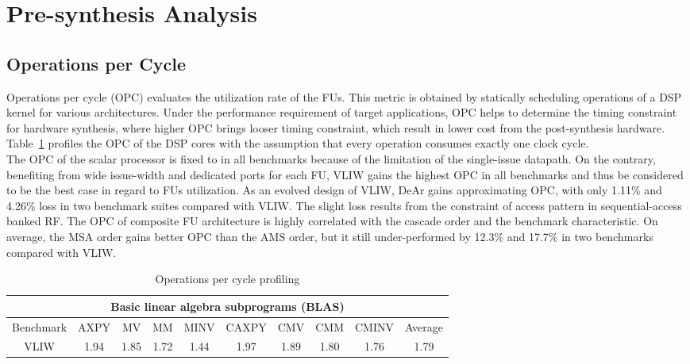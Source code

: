 \section{Pre-synthesis Analysis}
{
    \subsection{Operations per Cycle}
    Operations per cycle (OPC) evaluates the utilization rate of the FUs.
    This metric is obtained by statically scheduling operations of a DSP kernel for various architectures.
    Under the performance requirement of target applications, OPC helps to determine the timing constraint for hardware synthesis, 
    where higher OPC brings looser timing constraint, which result in lower cost from the post-synthesis hardware.
    Table~\ref{tab:opc} profiles the OPC of the DSP cores with the assumption that every operation consumes exactly one clock cycle.
    \\\indent The OPC of the scalar processor is fixed to in all benchmarks because of the limitation of the single-issue datapath.
    On the contrary, benefiting from wide issue-width and dedicated ports for each FU, 
    VLIW gains the highest OPC in all benchmarks and thus be considered to be the best case in regard to FUs utilization.
    As an evolved design of VLIW, DeAr gains approximating OPC, with only 1.11\% and 4.26\% loss in two benchmark suites compared with VLIW.
    The slight loss results from the constraint of access pattern in sequential-access banked RF.
    The OPC of composite FU architecture is highly correlated with the cascade order and the benchmark characteristic. 
    On average, the MSA order gains better OPC than the AMS order, 
    but it still under-performed by 12.3\% and 17.7\% in two benchmarks compared with VLIW.
    \begin{table}[!ht]
        \centering
        \caption{Operations per cycle profiling}
        \label{tab:opc}
        \resizebox{\columnwidth}{!}
        {
            \begin{tabular}{|c|c|c|c|c|c|c|c|c|c|}
                \hline
                 \multicolumn{10}{|c|}{\textbf{Basic linear algebra subprograms (BLAS)}} \\ \hline
                Benchmark  &  AXPY  &  MV  &  MM  &  MINV  &  CAXPY  &  CMV  &  CMM  &  CMINV  &  Average \\ \hline 
                VLIW  &   1.94  &   1.85  &   1.72  &   1.44  &   1.97  &   1.89  &   1.80  &   1.76  &   1.79     \\ \hline 

\end{tabular}}
\end{table}}

